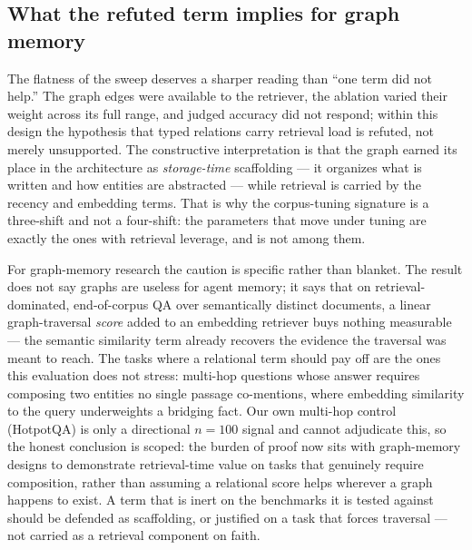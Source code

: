 \subsection{What the refuted \wgraph{} term implies for graph memory}
\label{sec:graphnegative}
The flatness of the \wgraph{} sweep deserves a sharper reading than ``one term
did not help.'' The graph edges were available to the retriever, the ablation
varied their weight across its full range, and judged accuracy did not respond;
within this design the hypothesis that typed relations carry retrieval load is
refuted, not merely unsupported. The constructive interpretation is that the
graph earned its place in the architecture as \emph{storage-time} scaffolding ---
it organizes what is written and how entities are abstracted --- while retrieval
is carried by the recency and embedding terms. That is why the corpus-tuning
signature is a three-shift and not a four-shift: the parameters that move under
tuning are exactly the ones with retrieval leverage, and \wgraph{} is not among
them.

For graph-memory research the caution is specific rather than blanket. The result
does not say graphs are useless for agent memory; it says that on
retrieval-dominated, end-of-corpus QA over semantically distinct documents, a
linear graph-traversal \emph{score} added to an embedding retriever buys nothing
measurable --- the semantic similarity term already recovers the evidence the
traversal was meant to reach. The tasks where a relational term should pay off
are the ones this evaluation does not stress: multi-hop questions whose answer
requires composing two entities no single passage co-mentions, where embedding
similarity to the query underweights a bridging fact. Our own multi-hop control
(HotpotQA) is only a directional $n{=}100$ signal and cannot adjudicate this, so
the honest conclusion is scoped: the burden of proof now sits with graph-memory
designs to demonstrate retrieval-time value on tasks that genuinely require
composition, rather than assuming a relational score helps wherever a graph
happens to exist. A term that is inert on the benchmarks it is tested against
should be defended as scaffolding, or justified on a task that forces
traversal --- not carried as a retrieval component on faith.

